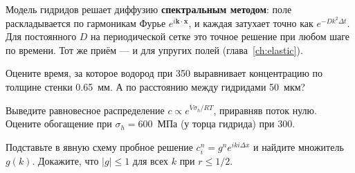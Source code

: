 Модель гидридов решает диффузию \textbf{спектральным методом}: поле раскладывается по гармоникам Фурье
$e^{i\mathbf k\cdot\mathbf x}$, и каждая затухает точно как $e^{-Dk^2\Delta t}$. Для постоянного $D$ на
периодической сетке это точное решение при любом шаге по времени. Тот же приём --- и для упругих полей
(глава~\ref{ch:elastic}).

\begin{exercise}
Оцените время, за которое водород при 350\degC{} выравнивает концентрацию по толщине стенки 0.65~мм.
А по расстоянию между гидридами 50~мкм?
\end{exercise}

\begin{exercise}
Выведите равновесное распределение $c\propto e^{\bar V\sigma_h/RT}$, приравняв поток нулю. Оцените обогащение при
$\sigma_h = 600$~МПа (у торца гидрида) при 300\degC.
\end{exercise}

\begin{exercise}
Подставьте в явную схему пробное решение $c_i^n = g^n e^{ik i\Delta x}$ и найдите множитель $g(k)$. Докажите, что
$|g|\le1$ для всех $k$ при $r\le1/2$.
\end{exercise}
